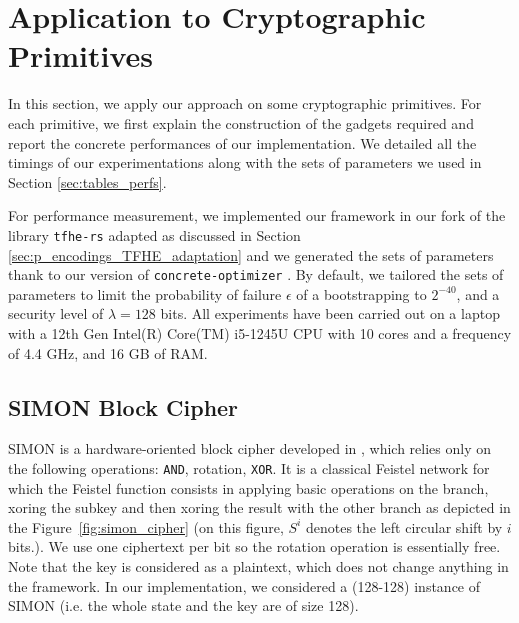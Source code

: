 
\section{Application to Cryptographic Primitives}
\label{sec:p_encodings_implementations}


In this section, we apply our approach on some cryptographic primitives. For each primitive, we first explain the construction of the gadgets required and report the concrete performances of our implementation. We detailed all the timings of our experimentations along with the sets of parameters we used in Section \ref{sec:tables_perfs}.

For performance measurement, we implemented our framework in our fork of the library \texttt{tfhe-rs} \cite{tfhe-rs} adapted as discussed in Section \ref{sec:p_encodings_TFHE_adaptation} and we generated the sets of parameters thank to our version of \texttt{concrete-optimizer} \cite{concrete-optimizer}. By default, we tailored the sets of parameters to limit the probability of failure $\epsilon$ of a bootstrapping to $2^{-40}$, and a security level of $\lambda = 128$ bits. All experiments have been carried out on a laptop with a 12th Gen Intel(R) Core(TM) i5-1245U CPU with 10 cores and a frequency of 4.4 GHz, and 16 GB of RAM.


\subsection{SIMON Block Cipher}
\label{sec:simon}

SIMON is a hardware-oriented block cipher developed in \cite{simon}, which relies only on the following operations: \texttt{AND}, rotation, \texttt{XOR}. It is a classical Feistel network for which the Feistel function consists in applying basic operations on the branch, xoring the subkey and then xoring the result with the other branch as depicted in the Figure~\ref{fig:simon_cipher} (on this figure, $S^i$ denotes the left circular shift by $i$ bits.). We use one ciphertext per bit so the rotation operation is essentially free. Note that the key is considered as a plaintext, which does not change anything in the framework. In our implementation, we considered a (128-128) instance of SIMON (i.e. the whole state and the key are of size 128). 


% 

